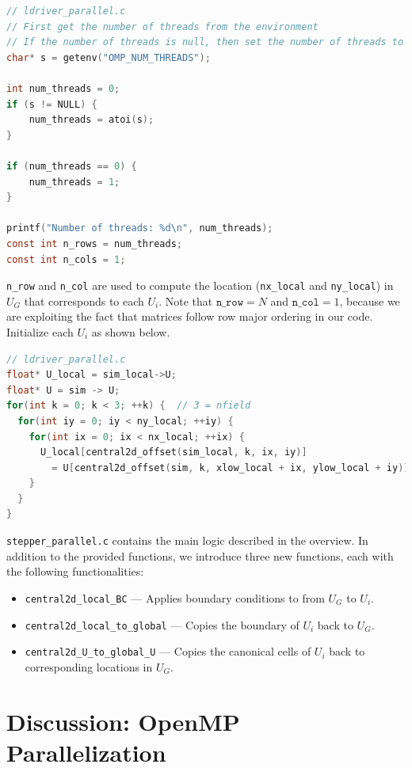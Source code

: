 \documentclass{article}
\begin{document}
\begin{lstlisting}[language=C]
// ldriver_parallel.c
// First get the number of threads from the environment
// If the number of threads is null, then set the number of threads to 1
char* s = getenv("OMP_NUM_THREADS");

int num_threads = 0;
if (s != NULL) {
    num_threads = atoi(s);
} 

if (num_threads == 0) {
    num_threads = 1;
}

printf("Number of threads: %d\n", num_threads);
const int n_rows = num_threads;
const int n_cols = 1;
\end{lstlisting}

\texttt{n\_row} and \texttt{n\_col} are used to compute the location (\texttt{nx\_local} and \texttt{ny\_local}) in $U_G$ that corresponds to each $U_i$. Note that $\texttt{n\_row} = N$ and $\texttt{n\_col} = 1$, because we are exploiting the fact that matrices follow row major ordering in our code. Initialize each $U_i$ as shown below.

\begin{lstlisting}[language=C]
// ldriver_parallel.c
float* U_local = sim_local->U;
float* U = sim -> U;
for(int k = 0; k < 3; ++k) {  // 3 = nfield
  for(int iy = 0; iy < ny_local; ++iy) {
    for(int ix = 0; ix < nx_local; ++ix) {
      U_local[central2d_offset(sim_local, k, ix, iy)]
        = U[central2d_offset(sim, k, xlow_local + ix, ylow_local + iy)];
    }
  }
}
\end{lstlisting}

\texttt{stepper\_parallel.c} contains the main logic described in the overview. In addition to the provided functions, we introduce three new functions, each with the following functionalities:

\begin{itemize}
	\item \texttt{central2d\_local\_BC} --- Applies boundary conditions to from $U_G$ to $U_i$.
	\item \texttt{central2d\_local\_to\_global} --- Copies the boundary of $U_i$ back to $U_G$.
	\item \texttt{central2d\_U\_to\_global\_U} --- Copies the canonical cells of $U_i$ back to corresponding locations in $U_G$.
\end{itemize}

\section{Discussion: OpenMP Parallelization}
\end{document}

